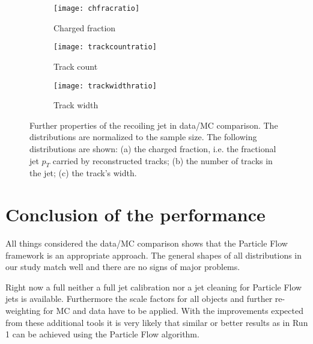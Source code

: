 \begin{figure}[h]
\centering
\begin{subfigure}[b]{0.5\figwidth}
\texttt{[image: chfracratio]}
\caption[Charged fraction]{Charged fraction}
\label{fig:chfrac}
\end{subfigure}


\centering
\begin{subfigure}[b]{0.5\figwidth}
\texttt{[image: trackcountratio]}
\caption[Track count]{Track count}
\label{fig:trackcount}
\end{subfigure}
\quad
\begin{subfigure}[b]{0.5\figwidth}
\texttt{[image: trackwidthratio]}
\caption[trackwidth]{Track width}
\label{fig:trackwidth}
\end{subfigure}
\caption{Further properties of the recoiling jet in data/MC comparison. The distributions are normalized to the sample size. The following distributions are shown: (a) the charged fraction, i.e. the fractional jet $p_T$ carried by reconstructed tracks; (b) the number of tracks in the jet; (c) the track's width.}
\label{fig:generalproperties}
\end{figure}


\section{Conclusion of the performance}

All things considered the data/MC comparison shows that the Particle Flow framework is an appropriate approach. The general shapes of all distributions in our study match well and there are no signs of major problems.

Right now a full neither a full jet calibration nor a jet cleaning for Particle Flow jets is available. Furthermore the scale factors for all objects and further re-weighting for MC and data have to be applied.
With the improvements expected from these additional tools it is very likely that similar or better results as in Run 1 can be achieved using the Particle Flow algorithm.


\label{results}
